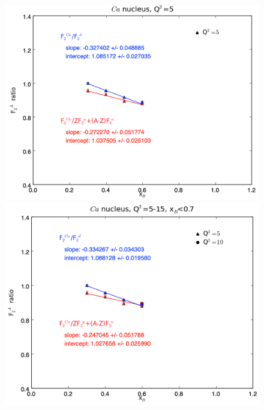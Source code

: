 \documentclass[oneside]{article}
\begin{document}
 \begin{figure}[H]
\begin{minipage}{0.5\textwidth}
 \includegraphics[width=\textwidth]{plots/q2_5/q2_5_Ca.png}
\end{minipage}\hfill\begin{minipage}{0.5\textwidth}
\includegraphics[width=\textwidth]{plots/q2_all_x_l7/q2_all_x_l7_Ca.png}
\end{minipage}\hfill\begin{minipage}{0.5\textwidth}

\end{minipage}
\end{figure}
\end{document}
